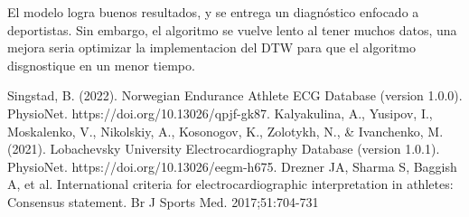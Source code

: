 \documentclass[conference]{IEEEtran}
\begin{document}
El modelo logra buenos resultados, y se entrega un diagnóstico enfocado a deportistas. 
Sin embargo, el algoritmo se vuelve lento al tener muchos datos, una mejora seria optimizar 
la implementacion del DTW para que el algoritmo disgnostique en un menor tiempo.

\begin{thebibliography}{00}
 Singstad, B. (2022). Norwegian Endurance Athlete ECG Database (version 1.0.0). PhysioNet. https://doi.org/10.13026/qpjf-gk87.
 Kalyakulina, A., Yusipov, I., Moskalenko, V., Nikolskiy, A., Kosonogov, K., Zolotykh, N., \& Ivanchenko, M. (2021). Lobachevsky University Electrocardiography Database (version 1.0.1). PhysioNet. https://doi.org/10.13026/eegm-h675.
 Drezner JA, Sharma S, Baggish A, et al. International criteria for electrocardiographic interpretation in athletes: Consensus statement. Br J Sports Med. 2017;51:704-731 
\end{thebibliography}
\end{document}
